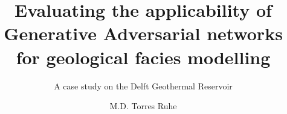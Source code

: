 \documentclass[whitelogo, oneside]{TUD-report2020}
\begin{document}
\frontmatter

\title[tudelft-white]{Evaluating the applicability of Generative Adversarial networks for geological facies modelling}
\subtitle[tudelft-black]{A case study on the Delft Geothermal Reservoir}
\author[tudelft-white]{M.D. Torres Ruhe}






 

\tableofcontents
{}

\mainmatter%







\printbibliography%

\appendix
{}







\end{document}
